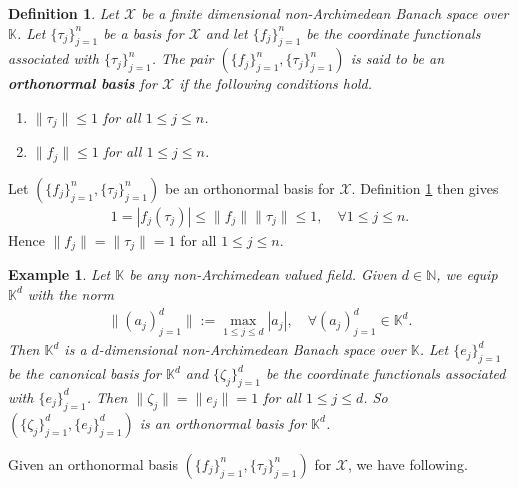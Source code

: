 \documentclass{amsart}
\newtheorem{definition}[theorem]{Definition}
\newtheorem{example}[theorem]{Example}
\begin{document}
\begin{definition}\label{FONB}
	Let $\mathcal{X}$  be a  finite dimensional non-Archimedean Banach  space over $\mathbb{K}$. Let $\{\tau_j\}_{j=1}^n$ be a basis for   $\mathcal{X}$ and 	let $\{f_j\}_{j=1}^n$ be the coordinate functionals associated with $\{\tau_j\}_{j=1}^n$. The pair $(\{f_j\}_{j=1}^n, \{\tau_j\}_{j=1}^n)$ is said to be an \textbf{orthonormal basis}  for $\mathcal{X}$ if  the following conditions hold.	
		\begin{enumerate}[\upshape(i)]
		\item $\|\tau_j\|\leq 1$ for all $1\leq j\leq n$.
		\item $\|f_j\|\leq 1$ for all $1\leq j\leq n$.
	\end{enumerate}
\end{definition}
Let $(\{f_j\}_{j=1}^n, \{\tau_j\}_{j=1}^n)$ be an orthonormal basis for $\mathcal{X}$. Definition \ref{FONB} then gives
\begin{align*}
	1=|f_j(\tau_j)|\leq \|f_j\|\|\tau_j\|\leq1, \quad \forall 1\leq j \leq n.
\end{align*}
Hence $\|f_j\|=\|\tau_j\|=1$ for all $1\leq j \leq n$.
\begin{example}
	Let $\mathbb{K}$ be any non-Archimedean valued field. Given $d \in \mathbb{N}$, we equip $\mathbb{K}^d$ with the norm 
	\begin{align*}
		\|(a_j)_{j=1}^d\|:= \max_{1\leq j \leq d}|a_j|, \quad \forall (a_j)_{j=1}^d\in 	\mathbb{K}^d.	
	\end{align*}
Then $\mathbb{K}^d$  is a $d$-dimensional non-Archimedean Banach  space over $\mathbb{K}$. Let $\{e_j\}_{j=1}^d$ be the  canonical basis for   $\mathbb{K}^d$ and $\{\zeta_j\}_{j=1}^d$ be the coordinate functionals associated with $\{e_j\}_{j=1}^d$. Then $\|\zeta_j\|= \|e_j\|=1$ for all $1\leq j\leq d$. So $(\{\zeta_j\}_{j=1}^d, \{e_j\}_{j=1}^d)$ is an  orthonormal basis  for $\mathbb{K}^d$.
\end{example}
Given an orthonormal basis $(\{f_j\}_{j=1}^n, \{\tau_j\}_{j=1}^n)$ for $\mathcal{X}$, we have following.
\end{document}
